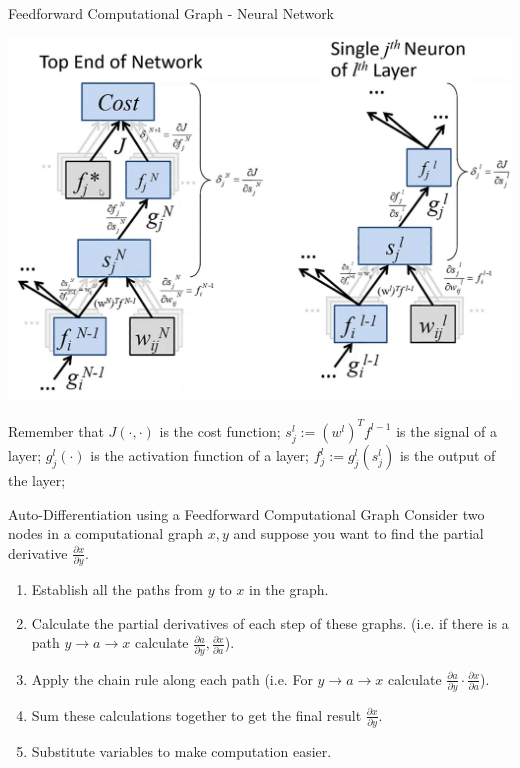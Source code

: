 \documentclass[11pt,a4paper]{article}
\begin{document}
\begin{proposition}{Feedforward Computational Graph - Neural Network}
  \begin{center}
    \includegraphics[width=.7\textwidth]{NeuralNetworkComputationalGraph.PNG}
  \end{center}
  Remember that $J(\cdot,\cdot)$ is the cost function; $s_j^l:=(w^l)^Tf^{l-1}$ is the signal of a layer; $g_j^l(\cdot)$ is the activation function of a layer; $f_j^l:=g_j^l(s_j^l)$ is the output of the layer;
\end{proposition}

\begin{definition}{Auto-Differentiation using a Feedforward Computational Graph}
  Consider two nodes in a computational graph $x,y$ and suppose you want to find the partial derivative $\frac{\partial x}{\partial y}$.
  \begin{enumerate}
    \item Establish all the paths from $y$ to $x$ in the graph.
    \item Calculate the partial derivatives of each step of these graphs. (i.e. if there is a path $y\to a\to x$ calculate $\frac{\partial a}{\partial y},\frac{\partial x}{\partial a}$).
    \item Apply the chain rule along each path (i.e. For $y\to a\to x$ calculate $\frac{\partial a}{\partial y}\cdot\frac{\partial x}{\partial a}$).
    \item Sum these calculations together to get the final result $\frac{\partial x}{\partial y}$.
    \item Substitute variables to make computation easier.
  \end{enumerate}
\end{definition}
\end{document}
